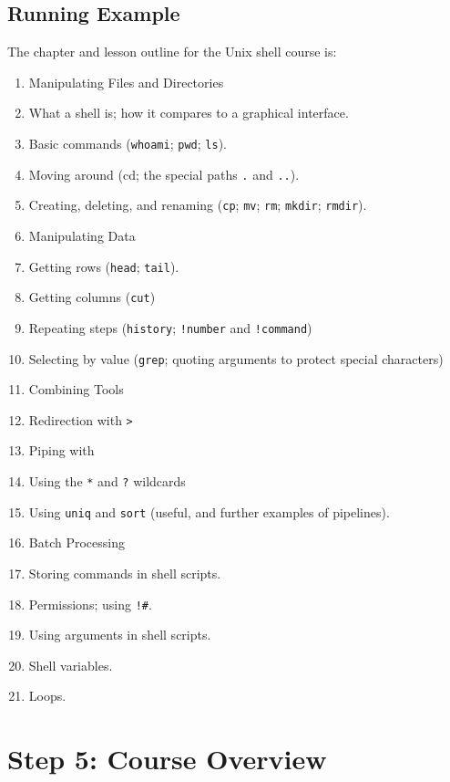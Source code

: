 \documentclass[10pt,statementpaper]{memoir}
\providecommand{\tightlist}{%
  \setlength{\itemsep}{0pt}\setlength{\parskip}{0pt}}
\begin{document}
\subsection*{Running Example}\label{running-example-3}

The chapter and lesson outline for the Unix shell course is:

\begin{enumerate}
\def\labelenumi{\arabic{enumi}.}
\tightlist
\item
  Manipulating Files and Directories
\item
  What a shell is; how it compares to a graphical interface.
\item
  Basic commands (\texttt{whoami}; \texttt{pwd}; \texttt{ls}).
\item
  Moving around (cd; the special paths \texttt{.} and \texttt{..}).
\item
  Creating, deleting, and renaming (\texttt{cp}; \texttt{mv};
  \texttt{rm}; \texttt{mkdir}; \texttt{rmdir}).
\item
  Manipulating Data
\item
  Getting rows (\texttt{head}; \texttt{tail}).
\item
  Getting columns (\texttt{cut})
\item
  Repeating steps (\texttt{history}; \texttt{!number} and
  \texttt{!command})
\item
  Selecting by value (\texttt{grep}; quoting arguments to protect
  special characters)
\item
  Combining Tools
\item
  Redirection with \texttt{\textgreater{}}
\item
  Piping with \texttt{\textbar{}}
\item
  Using the \texttt{*} and \texttt{?} wildcards
\item
  Using \texttt{uniq} and \texttt{sort} (useful, and further examples of
  pipelines).
\item
  Batch Processing
\item
  Storing commands in shell scripts.
\item
  Permissions; using \texttt{!\#}.
\item
  Using arguments in shell scripts.
\item
  Shell variables.
\item
  Loops.
\end{enumerate}

\section{Step 5: Course Overview}\label{step-5-course-overview}
\end{document}

